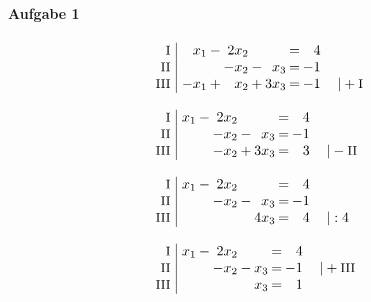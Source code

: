 
\paragraph{Aufgabe 1}
\begin{equation*}
\begin{array}{l}
\setlength{\arraycolsep}{1pt}
\begin{array}{r|rcrcrcrl}
    \text{\small I } &\;  x_{1} & - & 2x_{2} &   &        & = &  4 &                        \\
   \text{\small II } &\;        &   & -x_{2} & - &  x_{3} & = & -1 &                        \\
  \text{\small III } &\; -x_{1} & + &  x_{2} & + & 3x_{3} & = & -1 & \quad|+\text{\small I}   
\end{array}
\\ \\
\setlength{\arraycolsep}{1pt}
\begin{array}{r|rcrcrcrl}
    \text{\small I } &\; x_{1} & - & 2x_{2} &   &        & = &  4 &                         \\
   \text{\small II } &\;       &   & -x_{2} & - &  x_{3} & = & -1 &                         \\
  \text{\small III } &\;       &   & -x_{2} & + & 3x_{3} & = &  3 & \quad|-\text{\small II}   
\end{array}
\\ \\
\setlength{\arraycolsep}{1pt}
\begin{array}{r|rcrcrcrl}
    \text{\small I } &\; x_{1} & - & 2x_{2} &   &        & = &  4 &          \\
   \text{\small II } &\;       &   & -x_{2} & - &  x_{3} & = & -1 &          \\
  \text{\small III } &\;       &   &        &   & 4x_{3} & = &  4 & \quad|:4   
\end{array}
\\ \\
\setlength{\arraycolsep}{1pt}
\begin{array}{r|rcrcrcrl}
    \text{\small I } &\; x_{1} & - & 2x_{2} &   &       & = &  4 &                          \\
   \text{\small II } &\;       &   & -x_{2} & - & x_{3} & = & -1 & \quad|+\text{\small III} \\
  \text{\small III } &\;       &   &        &   & x_{3} & = &  1 &                            
\end{array}
\\ \\

\end{array}
\end{equation*}
